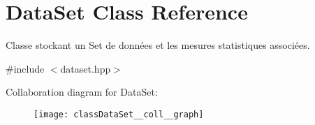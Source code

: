 \hypertarget{classDataSet}{}\section{Data\+Set Class Reference}
\label{classDataSet}


Classe stockant un Set de données et les mesures statistiques associées.  




{\ttfamily \#include $<$dataset.\+hpp$>$}



Collaboration diagram for Data\+Set\+:\nopagebreak
\begin{figure}[H]
\begin{center}
\leavevmode
\texttt{[image: classDataSet\_\_coll\_\_graph]}
\end{center}
\end{figure}
